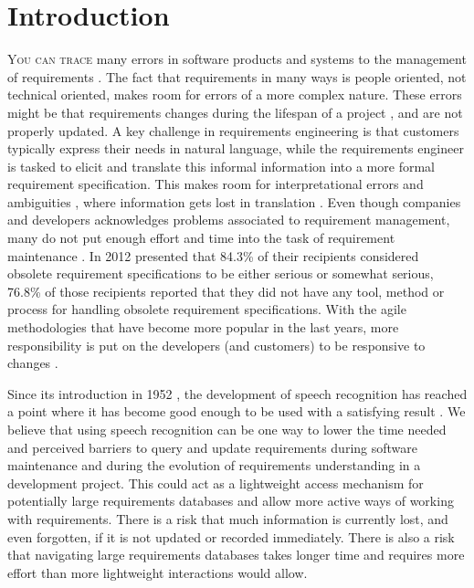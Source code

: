 \chapter{Introduction}
\lettrine[lines=4, loversize=-0.1, lraise=0.1]{Y}{ou can trace} many errors in software products and systems to the management of requirements \citep{tseng1998, wiegers2009software}. The fact that requirements in many ways is people oriented, not technical oriented, makes room for errors of a more complex nature. These errors might be that requirements changes during the lifespan of a project \citep{saiedian2000, bjarnason2011requirements}, and are not properly updated. A key challenge in requirements engineering is that customers typically express their needs in natural language, while the requirements engineer is tasked to elicit and translate this informal information into a more formal requirement specification. 
This makes room for interpretational errors and ambiguities \citep{al1996,ross1977}, where information gets lost in translation \citep{bjarnason2011requirements}. Even though companies and developers acknowledges problems associated to requirement management, many do not put enough effort and time into the task of requirement maintenance \citep{forward2002}. In 2012 \citet{wnuk2012obsolete} presented that 84.3\% of their recipients considered obsolete requirement specifications to be either serious or somewhat serious, 76.8\% of those recipients reported that they did not have any tool, method or process for handling obsolete requirement specifications. With the agile methodologies that have become more popular in the last years, more responsibility is put on the developers (and customers) to be responsive to changes \citep{highsmith2001, ibrahim2012overview}. 

Since its introduction in 1952 \citep{davis1952}, the development of speech recognition has reached a point where it has become good enough to be used with a satisfying result \citep{ballinger2011speech,ballinger2010lang,schalkwyk2010}. We believe that using speech recognition can be one way to lower the time needed and perceived barriers to query and update requirements during software maintenance and during the evolution of requirements understanding in a development project. This could act as a lightweight access mechanism for potentially large requirements databases and allow more active ways of working with requirements. There is a risk that much information is currently lost, and even forgotten, if it is not updated or recorded immediately. There is also a risk that navigating large requirements databases takes longer time and requires more effort than more lightweight interactions would allow.

